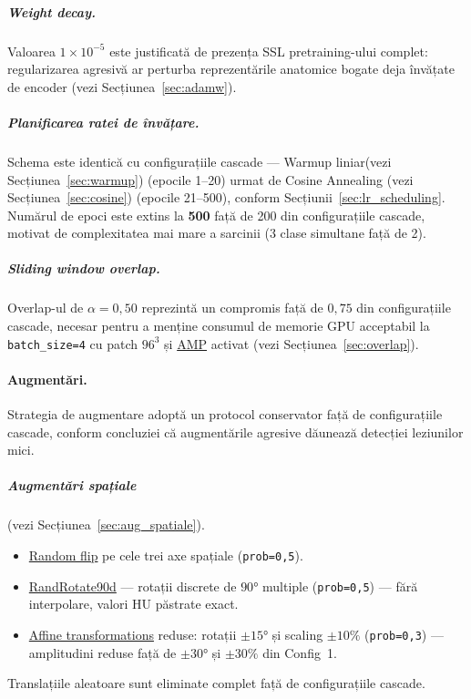 \documentclass[12pt, a4paper]{report}
\begin{document}
\subparagraph{Weight decay.}
Valoarea $1 \times 10^{-5}$ este justificată de prezența SSL
pretraining-ului complet: regularizarea agresivă ar perturba
reprezentările anatomice bogate deja învățate de encoder
(vezi Secțiunea~\ref{sec:adamw}).

\subparagraph{Planificarea ratei de învățare.}
Schema este identică cu configurațiile cascade — Warmup liniar(vezi Secțiunea~\ref{sec:warmup})
(epocile 1--20) urmat de Cosine Annealing (vezi Secțiunea~\ref{sec:cosine}) (epocile 21--500),
conform Secțiunii~\ref{sec:lr_scheduling}. Numărul de epoci
este extins la \textbf{500} față de 200 din configurațiile
cascade, motivat de complexitatea mai mare a sarcinii
(3 clase simultane față de 2).

\subparagraph{Sliding window overlap.}
Overlap-ul de $\alpha = 0{,}50$ reprezintă un compromis față
de $0{,}75$ din configurațiile cascade, necesar pentru a
menține consumul de memorie GPU acceptabil la
\texttt{batch\_size=4} cu patch $96^3$ și
\hyperref[sec:amp]{AMP} activat
(vezi Secțiunea~\ref{sec:overlap}).

\paragraph{Augmentări.}
Strategia de augmentare adoptă un protocol conservator față de
configurațiile cascade, conform concluziei că augmentările
agresive dăunează detecției leziunilor mici.

\subparagraph{Augmentări spațiale}
(vezi Secțiunea~\ref{sec:aug_spatiale}).
\begin{itemize}
    \item \hyperref[sec:randflip]{Random flip} pe cele trei axe
          spațiale (\texttt{prob=0,5}).
    \item \hyperref[sec:randrotate90]{RandRotate90d} —
          rotații discrete de $90°$ multiple
          (\texttt{prob=0,5}) — fără interpolare, valori
          HU păstrate exact.

    \item \hyperref[sec:randaffine]{Affine transformations}
          reduse: rotații $\pm15°$ și scaling $\pm10\%$
          (\texttt{prob=0,3}) — amplitudini reduse față de
          $\pm30°$ și $\pm30\%$ din Config~1.
\end{itemize}

Translațiile aleatoare sunt eliminate complet față de
configurațiile cascade.
\end{document}
